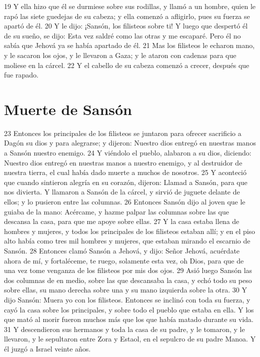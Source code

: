 19 Y ella hizo que él se durmiese sobre sus rodillas, y llamó a un hombre, quien le rapó las siete guedejas de su cabeza; y ella comenzó a afligirlo, pues su fuerza se apartó de él.
20 Y le dijo: ¡Sansón, los filisteos sobre ti! Y luego que despertó él de su sueño, se dijo: Esta vez saldré como las otras y me escaparé. Pero él no sabía que Jehová ya se había apartado de él.
21 Mas los filisteos le echaron mano, y le sacaron los ojos, y le llevaron a Gaza; y le ataron con cadenas para que moliese en la cárcel.
22 Y el cabello de su cabeza comenzó a crecer, después que fue rapado.
\section*{Muerte de Sansón}

23 Entonces los principales de los filisteos se juntaron para ofrecer sacrificio a Dagón su dios y para alegrarse; y dijeron: Nuestro dios entregó en nuestras manos a Sansón nuestro enemigo.
24 Y viéndolo el pueblo, alabaron a su dios, diciendo: Nuestro dios entregó en nuestras manos a nuestro enemigo, y al destruidor de nuestra tierra, el cual había dado muerte a muchos de nosotros. 
25 Y aconteció que cuando sintieron alegría en su corazón, dijeron: Llamad a Sansón, para que nos divierta. Y llamaron a Sansón de la cárcel, y sirvió de juguete delante de ellos; y lo pusieron entre las columnas.
26 Entonces Sansón dijo al joven que le guiaba de la mano: Acércame, y hazme palpar las columnas sobre las que descansa la casa, para que me apoye sobre ellas.
27 Y la casa estaba llena de hombres y mujeres, y todos los principales de los filisteos estaban allí; y en el piso alto había como tres mil hombres y mujeres, que estaban mirando el escarnio de Sansón.
28 Entonces clamó Sansón a Jehová, y dijo: Señor Jehová, acuérdate ahora de mí, y fortaléceme, te ruego, solamente esta vez, oh Dios, para que de una vez tome venganza de los filisteos por mis dos ojos.
29 Asió luego Sansón las dos columnas de en medio, sobre las que descansaba la casa, y echó todo su peso sobre ellas, su mano derecha sobre una y su mano izquierda sobre la otra.
30 Y dijo Sansón: Muera yo con los filisteos. Entonces se inclinó con toda su fuerza, y cayó la casa sobre los principales, y sobre todo el pueblo que estaba en ella. Y los que mató al morir fueron muchos más que los que había matado durante su vida.
31 Y descendieron sus hermanos y toda la casa de su padre, y le tomaron, y le llevaron, y le sepultaron entre Zora y Estaol, en el sepulcro de su padre Manoa. Y él juzgó a Israel veinte años.

